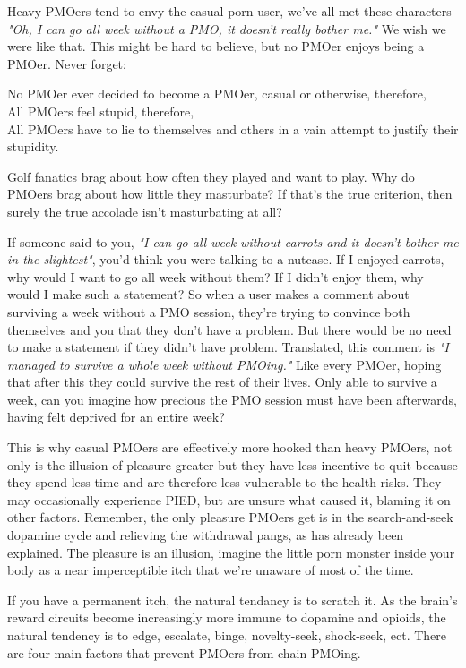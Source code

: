 \documentclass[easypeasy]{subfiles}
\begin{document}
Heavy PMOers tend to envy the casual porn user, we've all met these characters \textit{"Oh, I can go all week without a PMO, it doesn't really bother me."} We wish we were like that. This might be hard to believe, but no PMOer enjoys being a PMOer. Never forget:

  No PMOer ever decided to become a PMOer, casual or otherwise, therefore,\\
  All PMOers feel stupid, therefore,\\
  All PMOers have to lie to themselves and others in a vain attempt to justify their stupidity.

Golf fanatics brag about how often they played and want to play. Why do PMOers brag about how little they masturbate? If that's the true criterion, then surely the true accolade isn't masturbating at all?

If someone said to you, \textit{"I can go all week without carrots and it doesn't bother me in the slightest"}, you'd think you were talking to a nutcase. If I enjoyed carrots, why would I want to go all week without them? If I didn't enjoy them, why would I make such a statement? So when a user makes a comment about surviving a week without a PMO session, they're trying to convince both themselves and you that they don't have a problem. But there would be no need to make a statement if they didn't have problem. Translated, this comment is \textit{"I managed to survive a whole week without PMOing."} Like every PMOer, hoping that after this they could survive the rest of their lives. Only able to survive a week, can you imagine how precious the PMO session must have been afterwards, having felt deprived for an entire week?

This is why casual PMOers are effectively more hooked than heavy PMOers, not only is the illusion of pleasure greater but they have less incentive to quit because they spend less time and are therefore less vulnerable to the health risks. They may occasionally experience PIED, but are unsure what caused it, blaming it on other factors. Remember, the only pleasure PMOers get is in the search-and-seek dopamine cycle and relieving the withdrawal pangs, as has already been explained. The pleasure is an illusion, imagine the little porn monster inside your body as a near imperceptible itch that we're unaware of most of the time.

If you have a permanent itch, the natural tendancy is to scratch it. As the brain's reward circuits become increasingly more immune to dopamine and opioids, the natural tendency is to edge, escalate, binge, novelty-seek, shock-seek, ect. There are four main factors that prevent PMOers from chain-PMOing.
\end{document}
